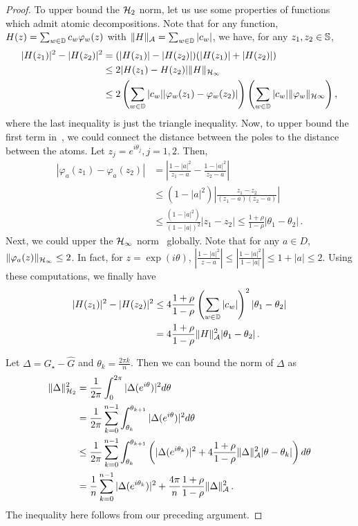 \begin{proof}
To upper bound the $\mathcal{H}_2$ norm, let us use some properties of functions which admit atomic decompositions.  Note that for any function, $H(z) = \sum_{w \in \mathbb{D}} c_w \varphi_w(z)$ with $\|H\|_{\mathcal{A}}=\sum_{w\in\mathbb{D}} |c_w|$, we have, for any $z_1,z_2\in\mathbb{S}$,
\begin{align}
\nonumber	|H(z_1)|^2-|H(z_2)|^2 &= 
	(|H(z_1)|-|H(z_2)|)(|H(z_1)|+|H(z_2)|) \\
\nonumber	&\leq 2 |H(z_1)-H(z_2)| \|H\|_{\mathcal{H}_{\infty}} \\
\label{eq:tri-ineq2}	&\leq 2 \left( \sum_{w \in \mathbb{D}} |c_w| |\varphi_w(z_1)-\varphi_w(z_2)|\right) \left(\sum_{w\in \mathbb{D}} |c_w| \|\varphi_w\|_{\mathcal{H}{\infty}}\right),
\end{align}
where the last inequality is just the triangle inequality. Now, to upper bound the first term in~, we could connect the distance between the poles to the distance between the atoms. Let $z_j = e^{i \theta_j}, j = 1,2$. Then,
\begin{align*}
|\varphi_a(z_1) - \varphi_a(z_2)|
& =   \left|\frac{1-|a|^2}{z_1-a}-\frac{1-|a|^2}{z_2-a}\right|\\
&\leq (1-|a|^2) \left|\frac{z_1-z_2}{(z_1-a)(z_2-a)} \right|\\
&\leq \frac{(1-|a|^2)}{(1-|a|)^2} |z_1-z_2| \leq \frac{1+\rho}{1-\rho} |\theta_1-\theta_2|\,.
\end{align*}
Next, we could upper the $\mathcal{H}_\infty$ norm~ globally. Note that
for any $a \in D$, $\|\varphi_a(z)\|_{\mathcal{H}_\infty} \leq 2$. In fact, for $z =
\exp(i\theta)$, $|\frac{1-|a|^2}{z-a}| \leq |\frac{1-|a|^2}{1-|a|}| \leq 1+|a|
\leq 2$. Using these computations, we finally have
\begin{align*}
|H(z_1)|^2-|H(z_2)|^2	&\leq 4 \frac{1+\rho}{1-\rho}  \left( \sum_{w \in \mathbb{D}} |c_w|\right)^2 |\theta_1-\theta_2|\\
\nonumber	 &= 4 \frac{1+\rho}{1-\rho}  \|H\|_{\mathcal{A}}^2 |\theta_1-\theta_2|\,.
\end{align*}

Let $\Delta = G_\star-\hat{G}$ and $\theta_k= \frac{2 \pi k}{n}$. Then we can
bound the norm of $\Delta$ as
\begin{align*}
\|\Delta\|_{\mathcal{H}_2}^2 &= \frac{1}{2\pi} \int_0^{2\pi} |\Delta(e^{i\theta})|^2 d\theta\\
&= \frac{1}{2\pi} \sum_{k=0}^{n-1} \int_{\theta_k}^{\theta_{k+1}} |\Delta(e^{i\theta})|^2 d\theta\\
&\leq \frac{1}{2\pi} \sum_{k=0}^{n-1} \int_{\theta_k}^{\theta_{k+1}} \left(|\Delta(e^{i\theta_k})|^2 + 4 \frac{1+\rho}{1-\rho} \|\Delta\|_{\mathcal{A}}^2 |\theta-\theta_k| \right)d\theta\\
&= \frac{1}{n}\sum_{k=0}^{n-1} |\Delta(e^{i\theta_k})|^2 + \frac{4\pi}{n} \frac{1+\rho}{1-\rho} \|\Delta\|_{\mathcal{A}}^2\,.
\end{align*}
The inequality here follows from our preceding argument. 


\end{proof}
